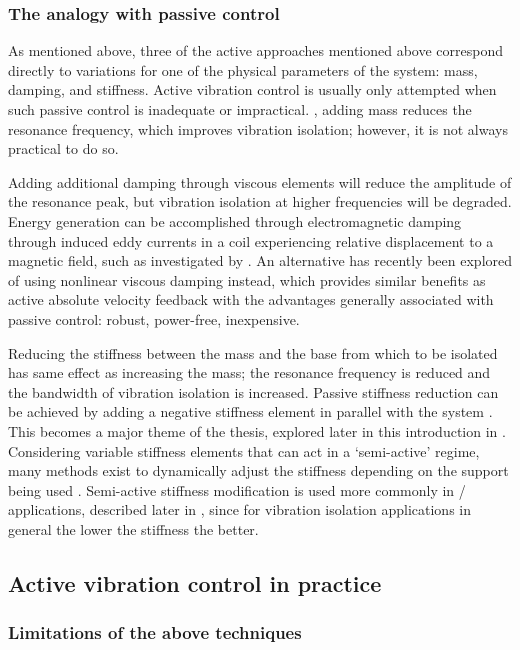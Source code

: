 \subsubsection{The analogy with passive control}

As mentioned above, three of the active approaches mentioned above correspond directly to variations for one of the physical parameters of the system: mass, damping, and stiffness.
Active vibration control is usually only attempted when such passive control is inadequate or impractical.
\Eg, adding mass reduces the resonance frequency, which improves vibration isolation; however, it is not always practical to do so.

Adding additional damping through viscous elements will reduce the amplitude of the resonance peak, but vibration isolation at higher frequencies will be degraded.
Energy generation can be accomplished through electromagnetic damping through induced eddy currents in a coil experiencing relative displacement to a magnetic field, such as investigated by \textcite{graves2000}.
An alternative has recently been explored of using nonlinear viscous damping instead, which provides similar benefits as active absolute velocity feedback  \cite{lang2009} with the advantages generally associated with passive control: robust, power-free, inexpensive.

Reducing the stiffness between the mass and the base from which to be isolated has same effect as increasing the mass; the resonance frequency is reduced and the bandwidth of vibration isolation is increased.
Passive stiffness reduction can be achieved by adding a negative stiffness element in parallel with the system \cite{lee2007-jsv,xing2005}.
This becomes a major theme of the thesis, explored later in this introduction in .
Considering variable stiffness elements that can act in a `semi-active' regime, many methods exist to dynamically adjust the stiffness depending on the support being used \cite[for example]{kidner2002,liu2006-jsv,liu2008-jsv}.
Semi-active stiffness modification is used more commonly in \vibneut/ applications, described later in , since for vibration isolation applications in general the lower the stiffness the better.

\subsection{Active vibration control in practice}

\subsubsection{Limitations of the above techniques}

